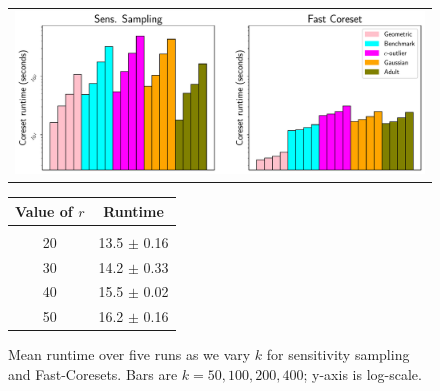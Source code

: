 \begin{figure}
\begin{minipage}{0.65\linewidth}
    \centering
    \begin{tabular}{c}
        \includegraphics[width=.95\linewidth]{images/2/coreset_runtime-Effect_of_k_for_sens_sampling.pdf}
    \end{tabular}
    \caption{Mean runtime over five runs as we vary $k$ for sensitivity sampling and Fast-Coresets. Bars are $k=50, 100, 200, 400$; y-axis is log-scale.}
    \label{fig:coreset_size_on_sens_quality}
\end{minipage}
\hspace{0.35cm}
\begin{minipage}{0.27\linewidth}
    \centering
    \begin{tabular}{cc}
        Value of $r$ & Runtime \\
        \hline
        \vspace*{-0.2cm}\\
        20 & 13.5 $\pm$ 0.16 \\
        30 & 14.2 $\pm$ 0.33 \\
        40 & 15.5 $\pm$ 0.02 \\
        50 & 16.2 $\pm$ 0.16 \\
    \end{tabular}
    \label{tbl:logdelta}
\end{minipage}
\end{figure}
